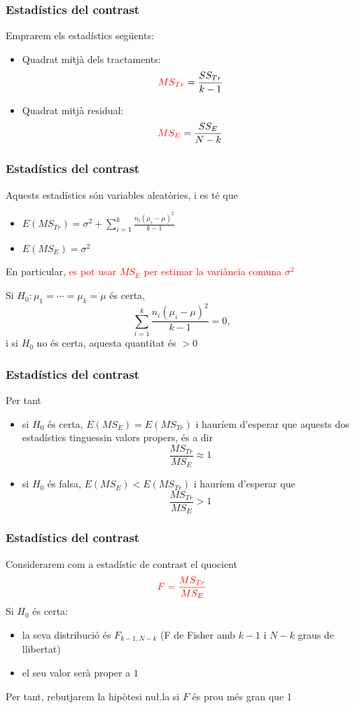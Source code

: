 \documentclass[12pt,t]{beamer}
\newcommand{\red}[1]{\textcolor{red}{#1}}
\renewcommand{\emph}[1]{{\color{red}#1}}
\theoremstyle{plain}
\theoremstyle{definition}
\begin{document}

\begin{frame}
\frametitle{Estadístics del contrast}

Emprarem els estadístics següents:
\begin{itemize}
\item \emph{Quadrat mitjà dels tractaments}:
$$
\red{MS_{Tr}}=\frac{SS_{Tr}}{k-1}
$$
\item \emph{Quadrat mitjà residual}:
$$
\red{MS_E}=\frac{SS_E}{N-k}
$$
\end{itemize}
\end{frame}


\begin{frame}
\frametitle{Estadístics del contrast}

Aquests estadístics són variables aleatòries, i es té que
\begin{itemize}
\item $E(MS_{Tr})=\displaystyle\sigma^2 + \sum_{i=1}^k \frac{n_i (\mu_i
-\mu)^2}{k-1}$
\medskip

\item $E(MS_E)=\sigma^2$
\end{itemize}
\bigskip

En particular, \red{es pot usar $MS_E$ per estimar la
variància comuna $\sigma^2$}
\pause\medskip


Si $H_0:\mu_1=\cdots=\mu_k=\mu$ és certa,
$$
\sum_{i=1}^k \frac{n_i (\mu_i -\mu)^2}{k-1}=0,
$$
i si $H_0$ no és certa, aquesta quantitat és $>0$

\end{frame}


\begin{frame}
\frametitle{Estadístics del contrast}

Per tant
\medskip

\begin{itemize}
\item si $H_0$ és certa, $E(MS_E)=E(MS_{Tr})$ i hauríem d'esperar que aquests dos estadístics  tinguessin valors propers, és a dir
$$
\frac{MS_{Tr}}{MS_E}\approx 1
$$
\item si $H_0$ és falsa, $E(MS_E)<E(MS_{Tr})$ i hauríem d'esperar que 
$$
\frac{MS_{Tr}}{MS_E}> 1
$$
\end{itemize}
\end{frame}


\begin{frame}
\frametitle{Estadístics del contrast}

Considerarem com a \emph{estadístic de contrast} el quocient 
$$
\red{F=\frac{MS_{Tr}}{MS_E}}
$$
Si $H_0$ és certa:
\medskip

\begin{itemize}
\item la seva distribució és $F_{k-1,N-k}$ (F de Fisher 
amb $k-1$ i $N-k$ graus de llibertat)
\medskip

\item el seu valor serà proper a $1$
\end{itemize}
\medskip

Per tant, rebutjarem la hipòtesi nu\l.la si $F$ és prou més gran que 1



\end{frame}
\end{document}

